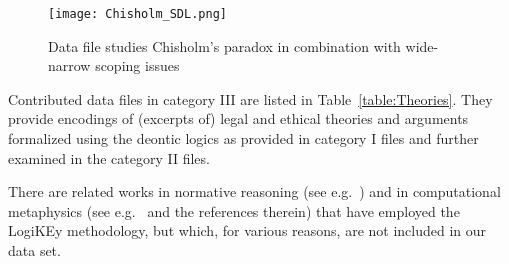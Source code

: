 \documentclass{article}
\begin{document}
\begin{figure}[ht!]
 \texttt{[image: Chisholm\_SDL.png]}
\caption{Data file \textsf{\small {}
    studies 
    Chisholm's paradox in combination with 
    wide-narrow scoping issues \label{fig:Chisholm_SDL}}}
\end{figure}

Contributed data files in category III are listed in
Table~\ref{table:Theories}. They provide encodings of (excerpts of)
legal and ethical theories and arguments formalized using the deontic logics as
provided in category I files and further examined in the category II
files.

There are related works in normative reasoning (see
e.g.~\cite{zahoransky19,C82,Maja?,}) and in computational metaphysics
(see e.g.~\cite{J47} and the references therein) that have 
employed the LogiKEy methodology, but which, for various reasons, are not
included in our data set.
\end{document}
